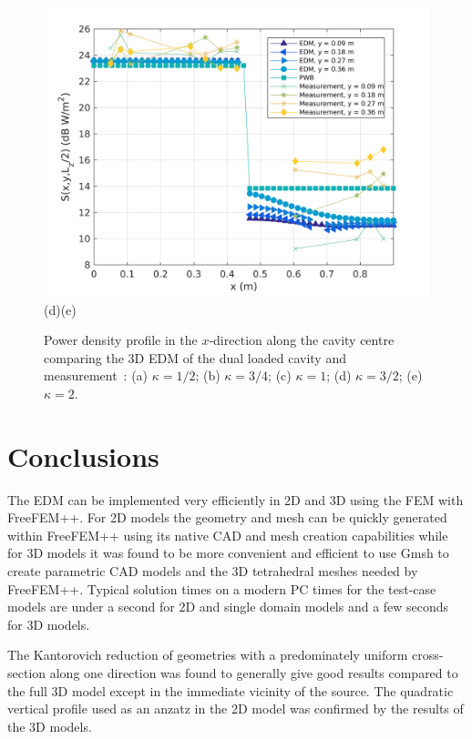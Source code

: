 \documentclass[a4paper]{article}
\numberwithin{equation}{section}
\begin{document}
\begin{figure}[hp]
\begin{center}
\includegraphics[width=0.49\linewidth]{figures/DDM-EEBC_3D_DL_PowerDensityProfileXMeas_JX_k2_0}\\
{\footnotesize (d)\hspace{75mm}(e)}\\
\vspace{-2mm}
\caption{\label{fg:measprofsdlk} Power density profile in the $x$-direction along the cavity centre comparing
the 3D EDM of the dual loaded cavity and measurement~\citep{Flintoft2017b}: (a) $\kappa=1/2$; (b) $\kappa=3/4$;
(c) $\kappa=1$; (d) $\kappa=3/2$; (e) $\kappa=2$.}
\end{center}
\end{figure}


\section[Conclusions]{Conclusions}
\label{sc:conc}

The EDM can be implemented very efficiently in 2D and 3D using the FEM with FreeFEM++. For 2D models the
geometry and mesh can be quickly generated within FreeFEM++ using its native CAD and mesh creation 
capabilities while for 3D models it was found to be more convenient and efficient to use Gmsh to
create parametric CAD models and the 3D tetrahedral meshes needed by FreeFEM++. Typical solution times
on a modern PC times for the test-case models are under a second for 2D and single domain models 
and a few seconds for 3D models. 

The Kantorovich reduction of geometries with a predominately uniform cross-section along one direction
was found to generally give good results compared to the full 3D model except in the immediate vicinity
of the source. The quadratic vertical profile used as an anzatz in the 2D model was confirmed by the
results of the 3D models.
\end{document}
